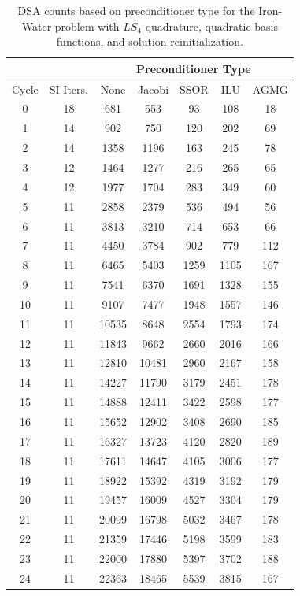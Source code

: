 \begin{table}
\caption{DSA counts based on preconditioner type for the Iron-Water problem with $LS_4$ quadrature, quadratic basis functions, and solution reinitialization.}
\begin{center}
\def\arraystretch{1.25}
\begin{tabular}{|c|c|c|c|c|c|c|}
\hline
& & \multicolumn{5}{c}{Preconditioner Type}\vline\\
\hline
Cycle & SI Iters. & None&Jacobi&SSOR& ILU& AGMG \\
\hline
0&18&681&553&93&108&18\\
1&14&902&750&120&202&69\\
2&14&1358&1196&163&245&78\\
3&12&1464&1277&216&265&65\\
4&12&1977&1704&283&349&60\\
5&11&2858&2379&536&494&56\\
6&11&3813&3210&714&653&66\\
7&11&4450&3784&902&779&112\\
8&11&6465&5403&1259&1105&167\\
9&11&7541&6370&1691&1328&155\\
10&11&9107&7477&1948&1557&146\\
11&11&10535&8648&2554&1793&174\\
12&11&11843&9662&2660&2016&166\\
13&11&12810&10481&2960&2167&158\\
14&11&14227&11790&3179&2451&178\\
15&11&14888&12411&3422&2598&177\\
16&11&15652&12902&3408&2690&185\\
17&11&16327&13723&4120&2820&189\\
18&11&17611&14647&4105&3006&177\\
19&11&18922&15392&4319&3192&179\\
20&11&19457&16009&4527&3304&179\\
21&11&20099&16798&5032&3467&178\\
22&11&21359&17446&5198&3599&183\\
23&11&22000&17880&5397&3702&188\\
24&11&22363&18465&5539&3815&167\\
\hline
\end{tabular}
\end{center}
\label{tab::DSA_IW_LS4_k2_reinit}
\end{table}

